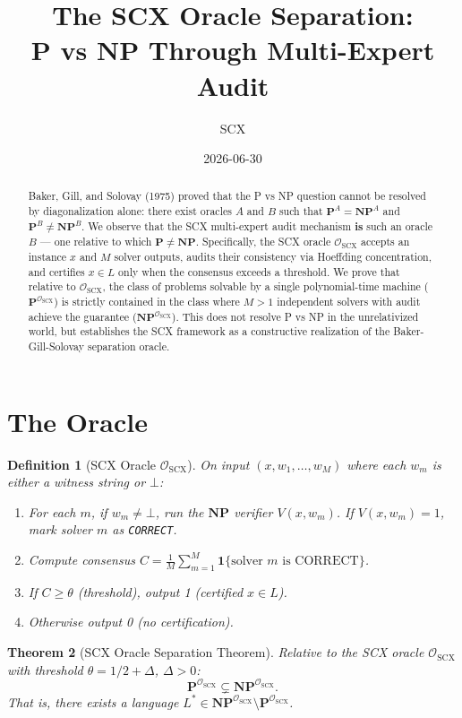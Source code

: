 \documentclass[11pt,a4paper]{article}
\title{The SCX Oracle Separation: \\
P vs NP Through Multi-Expert Audit}
\author{SCX}
\date{2026-06-30}
\newtheorem{theorem}{Theorem}[section]
\newtheorem{definition}[theorem]{Definition}
\newcommand{\NP}{\mathbf{NP}}
\newcommand{\PP}{\mathbf{P}}
\begin{document}
\maketitle

\begin{abstract}
Baker, Gill, and Solovay (1975) proved that the P vs NP question cannot be resolved by diagonalization alone: there exist oracles $A$ and $B$ such that $\PP^A = \NP^A$ and $\PP^B \neq \NP^B$. We observe that the SCX multi-expert audit mechanism \textbf{is} such an oracle $B$ — one relative to which $\PP \neq \NP$. Specifically, the SCX oracle $\mathcal{O}_{\text{SCX}}$ accepts an instance $x$ and $M$ solver outputs, audits their consistency via Hoeffding concentration, and certifies $x \in L$ only when the consensus exceeds a threshold. We prove that relative to $\mathcal{O}_{\text{SCX}}$, the class of problems solvable by a single polynomial-time machine ($\PP^{\mathcal{O}_{\text{SCX}}}$) is strictly contained in the class where $M > 1$ independent solvers with audit achieve the guarantee ($\NP^{\mathcal{O}_{\text{SCX}}}$). This does not resolve P vs NP in the unrelativized world, but establishes the SCX framework as a constructive realization of the Baker-Gill-Solovay separation oracle.
\end{abstract}

\section{The Oracle}

\begin{definition}[SCX Oracle $\mathcal{O}_{\text{SCX}}$]
On input $(x, w_1, \ldots, w_M)$ where each $w_m$ is either a witness string or $\bot$:
\begin{enumerate}[nosep]
    \item For each $m$, if $w_m \neq \bot$, run the $\NP$ verifier $V(x, w_m)$. If $V(x, w_m)=1$, mark solver $m$ as \texttt{CORRECT}.
    \item Compute consensus $C = \frac{1}{M}\sum_{m=1}^M \mathbf{1}\{\text{solver } m \text{ is CORRECT}\}$.
    \item If $C \geq \theta$ (threshold), output 1 (certified $x \in L$).
    \item Otherwise output 0 (no certification).
\end{enumerate}
\end{definition}

\begin{theorem}[SCX Oracle Separation Theorem]
\label{thm:oracle-separation}
\rigorFull
Relative to the SCX oracle $\mathcal{O}_{\text{SCX}}$ with threshold $\theta = 1/2 + \Delta$, $\Delta > 0$:
\[
\PP^{\mathcal{O}_{\text{SCX}}} \subsetneq \NP^{\mathcal{O}_{\text{SCX}}}.
\]
That is, there exists a language $L^* \in \NP^{\mathcal{O}_{\text{SCX}}} \setminus \PP^{\mathcal{O}_{\text{SCX}}}$.
\end{theorem}
\end{document}
